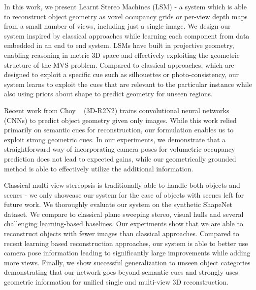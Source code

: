 \documentclass[../thesis.tex]{subfiles}
\begin{document}
In this work, we present Learnt Stereo Machines (LSM) - a system which is able to reconstruct object geometry as voxel occupancy grids or per-view depth maps from a small number of views, including just a single image. We design our system inspired by classical approaches while learning each component from data embedded in an end to end system. LSMs have built in projective geometry, enabling reasoning in metric 3D space and effectively exploiting the geometric structure of the MVS problem. Compared to classical approaches, which are designed to exploit a specific cue such as silhouettes or photo-consistency, our system learns to exploit the cues that are relevant to the particular instance while also using priors about shape to predict geometry for unseen regions.

Recent work from Choy \etal~\cite{choy20163d} (3D-R2N2) trains convolutional neural networks (CNNs) to predict object geometry given only images. While this work relied primarily on semantic cues for reconstruction, our formulation enables us to exploit strong geometric cues. In our experiments, we demonstrate that a straightforward way of incorporating camera poses for volumetric occupancy prediction does not lead to expected gains, while our geometrically grounded method is able to effectively utilize the additional information.

Classical multi-view stereopsis is traditionally able to handle both objects and scenes - we only showcase our system for the case of objects with scenes left for future work. We thoroughly evaluate our system on the synthetic ShapeNet~\cite{shapenet2015} dataset. We compare to classical plane sweeping stereo, visual hulls and several challenging learning-based baselines. Our experiments show that we are able to reconstruct objects with fewer images than classical approaches. Compared to recent learning based reconstruction approaches, our system is able to better use camera pose information leading to significantly large improvements while adding more views. Finally, we show successful generalization to unseen object categories demonstrating that our network goes beyond semantic cues and strongly uses geometric information for unified single and multi-view 3D reconstruction.


\end{document}
